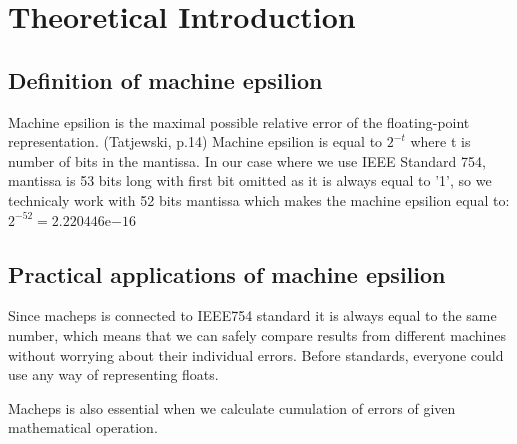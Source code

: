 \section{Theoretical Introduction}
\subsection{Definition of machine epsilion}
Machine epsilion is the maximal possible relative error of the floating-point representation. (Tatjewski, p.14)
Machine epsilion is equal to $2^{-t}$ where t is number of bits in the mantissa.
In our case where we use IEEE Standard 754, mantissa is 53 bits long with first bit omitted as it is always equal to '1', so we technicaly work with 52 bits mantissa which makes the machine epsilion equal to: $2^{-52} = 2.220446\mathrm{e}{-16}$

\newpage
\subsection{Practical applications of machine epsilion}
Since macheps is connected to IEEE754 standard it is always equal to the same number, which means that we can safely compare results from different machines without worrying about their individual errors. Before standards, everyone could use any way of representing floats.

Macheps is also essential when we calculate cumulation of errors of given mathematical operation.

\newpage
